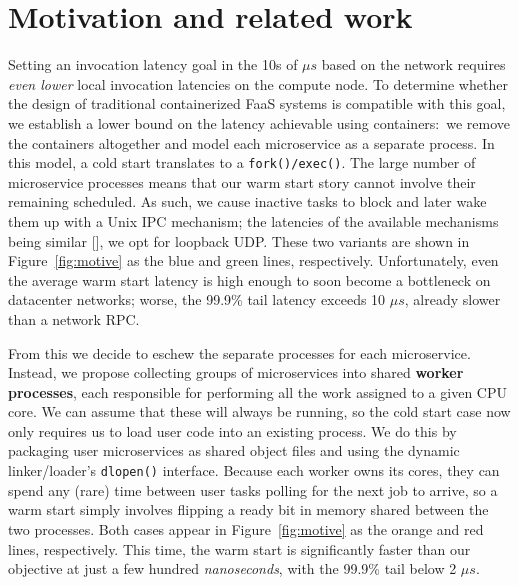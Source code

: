 \section{Motivation and related work}
\label{sec:motive}

Setting an invocation latency goal in the 10s of $\mu{}s$ based on the network
requires \textit{even lower} local invocation latencies on the compute node.  To
determine whether the design of traditional containerized FaaS systems is compatible
with this goal, we establish a lower bound on the latency achievable using
containers:\ we remove the containers altogether and model each microservice as a
separate process.  In this model, a cold start translates to a
\texttt{fork()/exec()}.  The large number of microservice processes means that our
warm start story cannot involve their remaining scheduled.  As such, we cause
inactive tasks to block and later wake them up with a Unix IPC mechanism; the
latencies of the available mechanisms being similar [], we opt for loopback UDP.
These two variants are shown in Figure~\ref{fig:motive} as the blue and green lines,
respectively.  Unfortunately, even the average warm start latency is high enough to
soon become a bottleneck on datacenter networks; worse, the 99.9\% tail latency
exceeds 10 $\mu{}s$, already slower than a network RPC.

From this we decide to eschew the separate processes for each microservice.  Instead,
we propose collecting groups of microservices into shared \textbf{worker processes},
each responsible for performing all the work assigned to a given CPU core.  We can
assume that these will always be running, so the cold start case now only requires us
to load user code into an existing process.  We do this by packaging user
microservices as shared object files and using the dynamic linker/loader's
\texttt{dlopen()} interface.  Because each worker owns its cores, they can spend any
(rare) time between user tasks polling for the next job to arrive, so a warm start
simply involves flipping a ready bit in memory shared between the two processes.
Both cases appear in Figure~\ref{fig:motive} as the orange and red lines,
respectively.  This time, the warm start is significantly faster than our objective
at just a few hundred \textit{nanoseconds}, with the 99.9\% tail below 2 $\mu{}s$.

